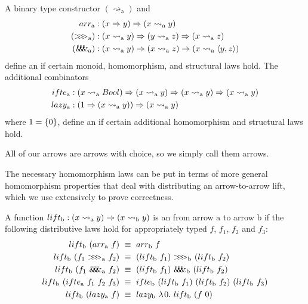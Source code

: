 \documentclass{llncs}
\newcommand{\arrow}{\rightsquigarrow}
\newcommand{\arrowlift}{\ensuremath{lift}}
\newcommand{\arrowarr}{\ensuremath{arr}}
\newcommand{\arrowcomp}{\ensuremath{{>}\mspace{-6mu}{>}\mspace{-6mu}{>}}}
\newcommand{\arrowpair}{\ensuremath{\mathit{\&\mspace{-7.5mu}\&\mspace{-7.5mu}\&}}}
\newcommand{\arrowif}{\ensuremath{ifte}}
\newcommand{\arrowlazy}{\ensuremath{lazy}}
\newcommand{\gen}{_\mathrm{a}}
\newcommand{\genb}{_\mathrm{b}}
\begin{document}
\begin{definition}A binary type constructor $(\arrow\gen)$ and
\begin{equation}
\begin{aligned}
	\arrowarr\gen &: (x \tto y) \tto (x \arrow\gen y)
\\
	(\arrowcomp\gen) &: (x \arrow\gen y) \tto (y \arrow\gen z) \tto (x \arrow\gen z)
\\
	(\arrowpair\gen) &: (x \arrow\gen y) \tto (x \arrow\gen z) \tto (x \arrow\gen \pair{y,z})
\end{aligned}
\label{eqn:arrow-combinators}
\end{equation}
define an  if certain monoid, homomorphism, and structural laws hold.
The additional combinators
\begin{equation}
\begin{aligned}
	\arrowif\gen &: (x \arrow\gen Bool) \tto (x \arrow\gen y) \tto (x \arrow\gen y) \tto (x \arrow\gen y)
\\
	\arrowlazy\gen &: (1 \tto (x \arrow\gen y)) \tto (x \arrow\gen y)
\end{aligned}
\end{equation}
where $1 = \{{0}\}$, define an  if certain additional homomorphism and structural laws hold.
\end{definition}

All of our arrows are arrows with choice, so we simply call them arrows.

The necessary homomorphism laws can be put in terms of more general homomorphism properties that deal with distributing an arrow-to-arrow lift, which we use extensively to prove correctness.

\begin{definition}
\label{def:arrow-homomorphism}
A function $lift\genb : (x \arrow\gen y) \tto (x \arrow\genb y)$ is an  from arrow $\mathrm{a}$ to arrow $\mathrm{b}$ if the following distributive laws hold for appropriately typed $f$, $f_1$, $f_2$ and $f_3$:
\begin{align}
	lift\genb~(\arrowarr\gen~f) &\ \equiv \ \arrowarr\genb~f
	\label{eqn:lift-distributes-over-arr}
\\
	lift\genb~(f_1~\arrowcomp\gen~f_2) &\ \equiv \ (lift\genb~f_1)~\arrowcomp\genb~(lift\genb~f_2)
	\label{eqn:lift-distributes-over-comp}
\\
	lift\genb~(f_1~\arrowpair\gen~f_2) &\ \equiv \ (lift\genb~f_1)~\arrowpair\genb~(lift\genb~f_2)
	\label{eqn:lift-distributes-over-pair}
\\
	\arrowlift\genb~(\arrowif\gen~f_1~f_2~f_3) &\ \equiv \ 
		\arrowif\genb~(lift\genb~f_1)~(lift\genb~f_2)~(lift\genb~f_3)
	\label{eqn:lift-distributes-over-if}
\\
	\arrowlift\genb~(\arrowlazy\gen~f) &\ \equiv \
		\arrowlazy\genb~\fun{0}{\arrowlift\genb~(f~0)}
	\label{eqn:lift-distributes-over-lazy}
\end{align}
\end{definition}
\end{document}
